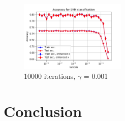 \documentclass[10pt,conference,compsocconf]{IEEEtran}
\begin{document}
\begin{figure}[H]
	\centering
	\includegraphics[width=0.45\textwidth]{accuracy_SVM.png}
	\caption{10000 iterations, $\gamma$ = 0.001}
\end{figure}


\section*{Conclusion}



\end{document}
